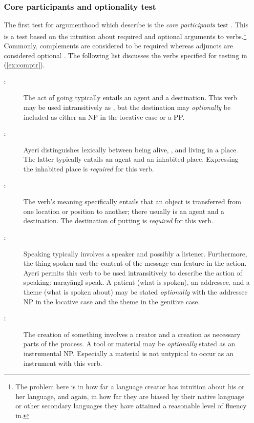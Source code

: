 \subsubsection{Core participants and optionality test}

The first test for argumenthood which \citet{needhamtoivonen2011} describe is
the \emph{core participants} test \citep[404]{needhamtoivonen2011}. This is a
test based on the intuition about required and optional arguments to
verbs.\footnote{The problem here is in how far a language creator has intuition
about his or her language, and again, in how far they are biased by their
native language or other secondary languages they have attained a reasonable
level of fluency in.} Commonly, complements are considered to be required
whereas adjuncts are considered optional \citep[405--407]{needhamtoivonen2011}.
The following list discusses the verbs specified for testing in
(\ref{ex:comptr}).

\begin{description}
	\item[:] The act of going typically entails an
	agent and a destination. This verb may be used intransitively as
	, but the destination may \emph{optionally}
	be included as either an NP in the locative case or a PP.

	\item[:] Ayeri distinguishes
	lexically between being alive, , and living in a place.
	The latter typically entails an agent and an inhabited place. Expressing
	the inhabited place is \emph{required} for this verb.

	\item[:] The verb's meaning specifically
	entails that an object is transferred from one location or position to
	another; there usually is an agent and a destination. The destination of
	putting is \emph{required} for this verb.

	\item[:] Speaking typically involves
	a speaker and possibly a listener. Furthermore, the thing spoken and the
	content of the message can feature in the action. Ayeri permits this verb
	to be used intransitively to describe the action of speaking:
	 {narayāng}{I speak}. A patient (what is spoken), an
	addressee, and a theme (what is spoken about) may be stated
	\emph{optionally} with the addressee NP in the locative case and the theme
	in the genitive case.

	\item[:] The creation of something involves
	a creator and a creation as necessary parts of the process. A tool or
	material may be \emph{optionally} stated as an instrumental NP. Especially
	a material is not untypical to occur as an instrument with this verb.
\end{description}

